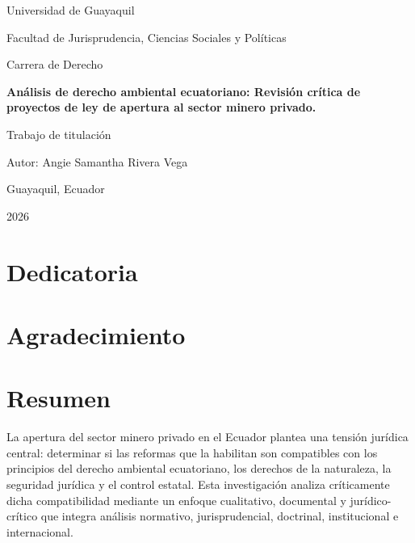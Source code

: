 
\begin{titlepage}
    \centering
    {\Large Universidad de Guayaquil\par}
    \vspace{1cm}
    {\large Facultad de Jurisprudencia, Ciencias Sociales y Políticas\par}
    \vspace{1cm}
    {\large Carrera de Derecho\par}
    \vspace{2cm}
    {\bfseries\Large Análisis de derecho ambiental ecuatoriano: Revisión crítica de proyectos de ley de apertura al sector minero privado.\par}
    \vspace{2cm}
    {\large Trabajo de titulación\par}
    \vfill
    {\large Autor: Angie Samantha Rivera Vega\par}
    \vspace{0.5cm}
    {\large Guayaquil, Ecuador\par}
    {\large 2026\par}
\end{titlepage}

\chapter*{Dedicatoria}

\chapter*{Agradecimiento}

\chapter*{Resumen}

La apertura del sector minero privado en el Ecuador plantea una tensión jurídica central: determinar si las reformas que la habilitan son compatibles con los principios del derecho ambiental ecuatoriano, los derechos de la naturaleza, la seguridad jurídica y el control estatal. Esta investigación analiza críticamente dicha compatibilidad mediante un enfoque cualitativo, documental y jurídico-crítico que integra análisis normativo, jurisprudencial, doctrinal, institucional e internacional.

